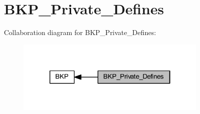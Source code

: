 \hypertarget{group___b_k_p___private___defines}{}\section{B\+K\+P\+\_\+\+Private\+\_\+\+Defines}
\label{group___b_k_p___private___defines}
Collaboration diagram for B\+K\+P\+\_\+\+Private\+\_\+\+Defines\+:
\nopagebreak
\begin{figure}[H]
\begin{center}
\leavevmode
\includegraphics[width=262pt]{group___b_k_p___private___defines}
\end{center}
\end{figure}
